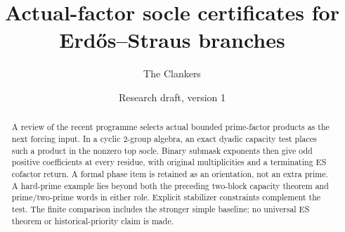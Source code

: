 \documentclass[10pt,a4paper]{article}
\title{Actual-factor socle certificates for Erd\H{o}s--Straus branches}
\author{The Clankers}
\date{Research draft, version 1}
\begin{document}
\maketitle
\begin{abstract}
A review of the recent programme selects actual bounded prime-factor products
as the next forcing input. In a cyclic $2$-group algebra, an exact dyadic
capacity test places such a product in the nonzero top socle. Binary submask
exponents then give odd positive coefficients at every residue, with original
multiplicities and a terminating ES cofactor return. A formal phase item is
retained as an orientation, not an extra prime. A hard-prime example lies
beyond both the preceding two-block capacity theorem and prime/two-prime
words in either role. Explicit stabilizer constraints complement the test.
The finite comparison includes the stronger simple baseline; no universal
ES theorem or historical-priority claim is made.
\end{abstract}


\end{document}
